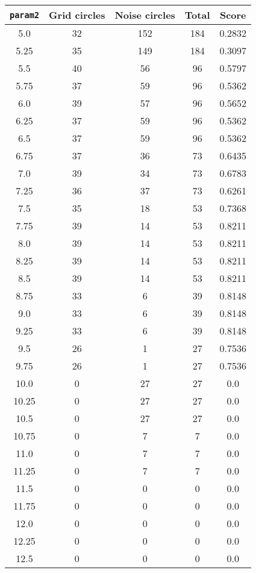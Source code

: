 \documentclass[letterpaper, 12pt]{article}
\begin{document}
\begin{longtable}{|c|c|c|c|c|}
\hline
\textbf{\texttt{param2}} & \textbf{Grid circles} & \textbf{Noise circles} & \textbf{Total} & \textbf{Score} \\
\hline
5.0 & 32 & 152 & 184 & 0.2832 \\
\hline
5.25 & 35 & 149 & 184 & 0.3097 \\
\hline
5.5 & 40 & 56 & 96 & 0.5797 \\
\hline
5.75 & 37 & 59 & 96 & 0.5362 \\
\hline
6.0 & 39 & 57 & 96 & 0.5652 \\
\hline
6.25 & 37 & 59 & 96 & 0.5362 \\
\hline
6.5 & 37 & 59 & 96 & 0.5362 \\
\hline
6.75 & 37 & 36 & 73 & 0.6435 \\
\hline
7.0 & 39 & 34 & 73 & 0.6783 \\
\hline
7.25 & 36 & 37 & 73 & 0.6261 \\
\hline
7.5 & 35 & 18 & 53 & 0.7368 \\
\hline
7.75 & 39 & 14 & 53 & 0.8211 \\
\hline
8.0 & 39 & 14 & 53 & 0.8211 \\
\hline
8.25 & 39 & 14 & 53 & 0.8211 \\
\hline
8.5 & 39 & 14 & 53 & 0.8211 \\
\hline
8.75 & 33 & 6 & 39 & 0.8148 \\
\hline
9.0 & 33 & 6 & 39 & 0.8148 \\
\hline
9.25 & 33 & 6 & 39 & 0.8148 \\
\hline
9.5 & 26 & 1 & 27 & 0.7536 \\
\hline
9.75 & 26 & 1 & 27 & 0.7536 \\
\hline
10.0 & 0 & 27 & 27 & 0.0 \\
\hline
10.25 & 0 & 27 & 27 & 0.0 \\
\hline
10.5 & 0 & 27 & 27 & 0.0 \\
\hline
10.75 & 0 & 7 & 7 & 0.0 \\
\hline
11.0 & 0 & 7 & 7 & 0.0 \\
\hline
11.25 & 0 & 7 & 7 & 0.0 \\
\hline
11.5 & 0 & 0 & 0 & 0.0 \\
\hline
11.75 & 0 & 0 & 0 & 0.0 \\
\hline
12.0 & 0 & 0 & 0 & 0.0 \\
\hline
12.25 & 0 & 0 & 0 & 0.0 \\
\hline
12.5 & 0 & 0 & 0 & 0.0 \\

\end{longtable}
\end{document}
